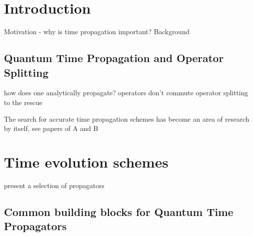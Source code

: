 





\clearemptydoublepage

\mbox{}
\vfill

\vfill
\tableofcontents

\clearpage

\listoffigures
\listofalgorithms

\clearemptydoublepage

% 
% 
% 
% 
% 
% 






\clearpage
\section{Introduction}

Motivation - why is time propagation important?
Background

\subsection{Quantum Time Propagation and Operator Splitting}

how does one analytically propagate?
operators don't commute
operator splitting to the rescue

The search for accurate time propagation schemes has become an area of research by itself, see papers of A and B


\clearpage
\section{Time evolution schemes}

present a selection of propagators

\subsection{Common building blocks for Quantum Time Propagators}
